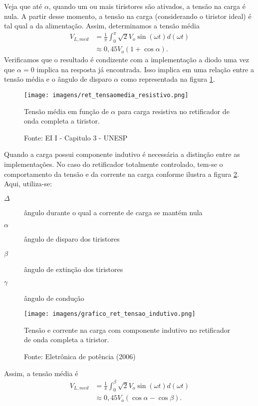 Veja que até $\alpha$, quando um ou mais tiristores são ativados, a tensão na carga é nula. A partir desse momento, a tensão na carga (considerando o tiristor ideal) é tal qual a da alimentação. Assim, determinamos a tensão média
\begin{align*}
    V_{L,med} &= \frac{1}{\pi} \int_{0}^{\pi} \sqrt{2}V_{o}\sin(\omega{t})d(\omega{t})\\
&\approx 0,45V_{o}(1+\cos\alpha)
.\end{align*}
Verificamos que o resultado é condizente com a implementação a diodo uma vez que $\alpha=0$ implica na resposta já encontrada. Isso implica em uma relação entre a tensão média e o ângulo de disparo $\alpha$ como representada na figura \ref{gtmed}.

\begin{figure}[h]
\center
\texttt{[image: imagens/ret\_tensaomedia\_resistivo.png]}
\caption{Tensão média em função de $\alpha$ para carga resistiva no retificador de onda completa a tiristor.}\label{gtmed}
\caption*{Fonte:  EI I - Capitulo 3 - UNESP}
\end{figure}

Quando a carga possui componente indutivo é necessária a distinção entre as implementações. No caso do retificador totalmente controlado, tem-se o comportamento da tensão e da corrente na carga conforme ilustra a figura \ref{greti}. Aqui, utiliza-se:
\begin{description}
    \item[$\Delta$]  ângulo durante o qual a corrente de carga se mantém nula 
    \item[$\alpha$]  ângulo de disparo dos tiristores 
    \item[$\beta$] ângulo de extinção dos tiristores 
    \item[$\gamma$]  ângulo de condução
\end{description}

\begin{figure}[h]
\center
\texttt{[image: imagens/grafico\_ret\_tensao\_indutivo.png]}
\caption{Tensão e corrente na carga com componente indutivo no retificador de onda completa a tiristor.}\label{greti}
\caption*{Fonte: Eletrônica de potência (2006)}
\end{figure}

Assim, a tensão média é
\begin{align*}
    V_{L,med} &= \frac{1}{\pi}\int_{0}^{\beta}\sqrt{2}V_{o}\sin(\omega{t})d(\omega{t}) \\
&\approx 0,45V_{o}(\cos\alpha - \cos\beta)
.\end{align*}

